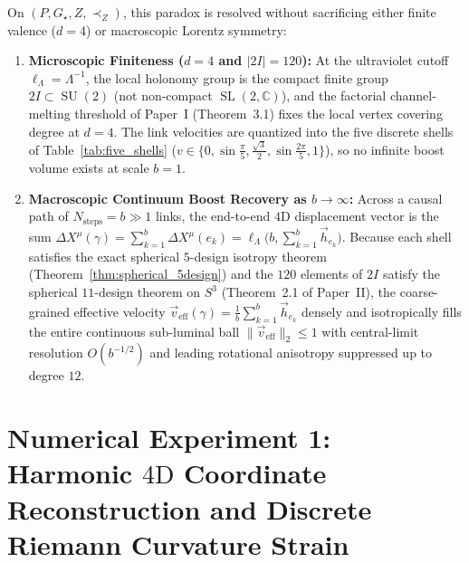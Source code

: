 \documentclass[11pt,a4paper]{article}
\theoremstyle{definition}
\theoremstyle{remark}
\newcommand{\C}{\mathbb{C}}
\newcommand{\SU}{\operatorname{SU}}
\newcommand{\SL}{\operatorname{SL}}
\newcommand{\Gstar}{G_\star}
\begin{document}
On $(P, \Gstar, Z, \prec_Z)$, this paradox is resolved without sacrificing either finite valence ($d = 4$) or macroscopic Lorentz symmetry:
\begin{enumerate}
    \item \textbf{Microscopic Finiteness ($d = 4$ and $|2I| = 120$):} At the ultraviolet cutoff $\ell_\Lambda = \Lambda^{-1}$, the local holonomy group is the compact finite group $2I \subset \SU(2)$ (not non-compact $\SL(2,\C)$), and the factorial channel-melting threshold of Paper~I (Theorem~3.1) fixes the local vertex covering degree at $d = 4$. The link velocities are quantized into the five discrete shells of Table~\ref{tab:five_shells} ($v \in \{0, \sin\frac{\pi}{5}, \frac{\sqrt{3}}{2}, \sin\frac{2\pi}{5}, 1\}$), so no infinite boost volume exists at scale $b = 1$.
    \item \textbf{Macroscopic Continuum Boost Recovery as $b \to \infty$:} Across a causal path of $N_{\mathrm{steps}} = b \gg 1$ links, the end-to-end $4\text{D}$ displacement vector is the sum $\Delta X^\mu(\gamma) = \sum_{k=1}^b \Delta X^\mu(e_k) = \ell_\Lambda\bigl(b, \sum_{k=1}^b \vec{h}_{e_k}\bigr)$. Because each shell satisfies the exact spherical $5$-design isotropy theorem (Theorem~\ref{thm:spherical_5design}) and the $120$ elements of $2I$ satisfy the spherical $11$-design theorem on $S^3$ (Theorem~2.1 of Paper~II), the coarse-grained effective velocity $\vec{v}_{\mathrm{eff}}(\gamma) = \frac{1}{b}\sum_{k=1}^b \vec{h}_{e_k}$ densely and isotropically fills the entire continuous sub-luminal ball $\|\vec{v}_{\mathrm{eff}}\|_2 \le 1$ with central-limit resolution $O(b^{-1/2})$ and leading rotational anisotropy suppressed up to degree $12$.
\end{enumerate}

\section{Numerical Experiment 1: Harmonic \texorpdfstring{$4\text{D}$}{4D} Coordinate Reconstruction and Discrete Riemann Curvature Strain}
\label{sec:exp_harmonic}
\end{document}
